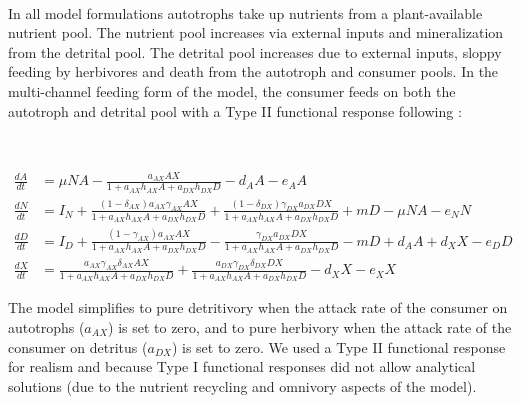 \documentclass[12pt,a4paper,oneside]{article}
\begin{document}
\\
\indent In all model formulations autotrophs take up nutrients from a
plant-available nutrient pool. The nutrient pool increases via external
inputs and mineralization from the detrital pool. The detrital pool
increases due to external inputs, sloppy feeding by herbivores and death
from the autotroph and consumer pools. In the multi-channel feeding form of
the model, the consumer feeds on both the autotroph and detrital pool with a Type II functional response
following \cite{Chesson:1983}:

\\
\begin{small}
\begin{align*}
 \frac{dA}{dt} &=\mu NA- \frac{a_{AX}AX}{1+a_{AX}h_{AX}A+a_{DX}h_{DX}D} - d_{A}A- e_{A}A  
\\[2em]
 \frac{dN}{dt} &= I_{N} +
 \frac{(1-\delta_{AX})a_{AX}\gamma_{AX}AX}{1+a_{AX}h_{AX}A+a_{DX}h_{DX}D}
 +
 \frac{(1-\delta_{DX})\gamma_{DX}a_{DX}DX}{1+a_{AX}h_{AX}A+a_{DX}h_{DX}D}+
 mD -\mu NA- e_{N}N
\\[2em]
 \frac{dD}{dt} &= I_{D} +
 \frac{(1-\gamma_{AX})a_{AX}AX}{1+a_{AX}h_{AX}A+a_{DX}h_{DX}D} -
 \frac{\gamma_{DX}a_{DX}DX}{1+a_{AX}h_{AX}A+a_{DX}h_{DX}D} - mD + d_{A}A +
 d_{X}X - e_{D}D
\\[2em]
 \frac{dX}{dt} &=
 \frac{a_{AX}\gamma_{AX}\delta_{AX}AX}{1+a_{AX}h_{AX}A+a_{DX}h_{DX}D} +
 \frac{a_{DX}\gamma_{DX}\delta_{DX}DX}{1+a_{AX}h_{AX}A+a_{DX}h_{DX}D}- d_{X}X - e_{X}X
\end{align*}
\end{small}

\noindent The model simplifies to pure detritivory when the attack rate
of the consumer on autotrophs (\(a_{AX}\)) is
set to zero, and to pure herbivory when the attack rate
of the consumer on detritus (\(a_{DX}\)) is
set to zero. We used a Type II functional response for realism and because Type I functional responses did not allow analytical solutions (due to the nutrient recycling and omnivory aspects of the model).
\end{document}
